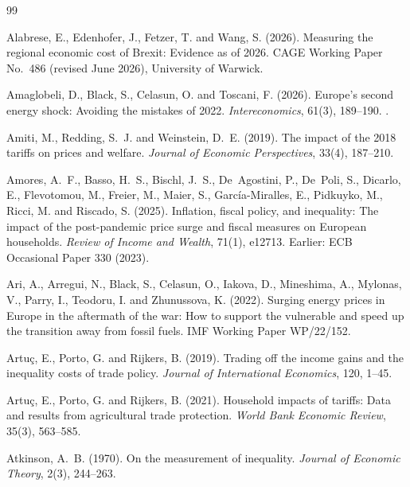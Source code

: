 \begingroup\sloppy
\begin{thebibliography}{99}

Alabrese, E., Edenhofer, J., Fetzer, T. and Wang, S. (2026).
\newblock Measuring the regional economic cost of Brexit: Evidence as of 2026.
\newblock CAGE Working Paper No.~486 (revised June 2026), University of Warwick.

Amaglobeli, D., Black, S., Celasun, O. and Toscani, F. (2026).
\newblock Europe's second energy shock: Avoiding the mistakes of 2022.
\newblock \emph{Intereconomics}, 61(3), 189--190. .

Amiti, M., Redding, S.~J. and Weinstein, D.~E. (2019).
\newblock The impact of the 2018 tariffs on prices and welfare.
\newblock \emph{Journal of Economic Perspectives}, 33(4), 187--210.

Amores, A.~F., Basso, H.~S., Bischl, J.~S., De~Agostini, P., De~Poli, S., Dicarlo, E., Flevotomou, M., Freier, M., Maier, S., Garc\'ia-Miralles, E., Pidkuyko, M., Ricci, M. and Riscado, S. (2025).
\newblock Inflation, fiscal policy, and inequality: The impact of the post-pandemic price surge and fiscal measures on European households.
\newblock \emph{Review of Income and Wealth}, 71(1), e12713. Earlier: ECB Occasional Paper 330 (2023).

Ari, A., Arregui, N., Black, S., Celasun, O., Iakova, D., Mineshima, A., Mylonas, V., Parry, I., Teodoru, I. and Zhunussova, K. (2022).
\newblock Surging energy prices in Europe in the aftermath of the war: How to support the vulnerable and speed up the transition away from fossil fuels.
\newblock IMF Working Paper WP/22/152.

Artu\c{c}, E., Porto, G. and Rijkers, B. (2019).
\newblock Trading off the income gains and the inequality costs of trade policy.
\newblock \emph{Journal of International Economics}, 120, 1--45.

Artu\c{c}, E., Porto, G. and Rijkers, B. (2021).
\newblock Household impacts of tariffs: Data and results from agricultural trade protection.
\newblock \emph{World Bank Economic Review}, 35(3), 563--585.

Atkinson, A.~B. (1970).
\newblock On the measurement of inequality.
\newblock \emph{Journal of Economic Theory}, 2(3), 244--263.


\end{thebibliography}
